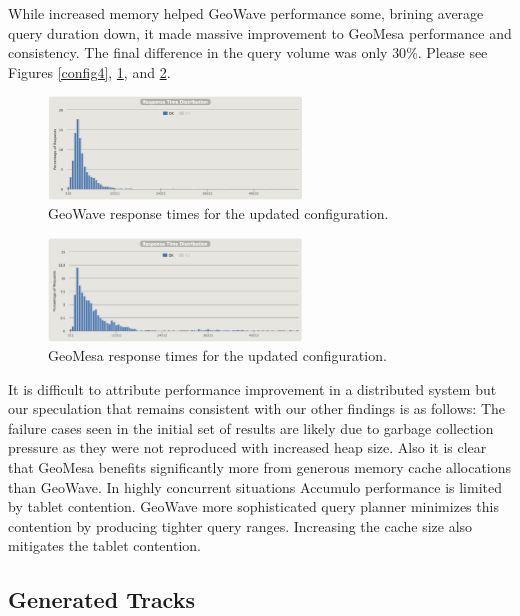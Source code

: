 While increased memory helped GeoWave performance some, brining average query duration down, it made massive improvement to GeoMesa performance and consistency.
The final difference in the query volume was only $30$\%.
Please see Figures \ref{config4}, \ref{config4distrogw}, and \ref{config4distrogm}.

\begin{figure}[h!tb]
  \centering
  \includegraphics[width=0.60\textwidth]{images/mt4-gw.png}
  \caption{GeoWave response times for the updated configuration.}
  \label{config4distrogw}
\end{figure}

\begin{figure}[h!tb]
  \centering
  \includegraphics[width=0.60\textwidth]{images/gm-4.png}
  \caption{GeoMesa response times for the updated configuration.}
  \label{config4distrogm}
\end{figure}

It is difficult to attribute performance improvement in a distributed system but our speculation that remains consistent with our other findings is as follows: The failure cases seen in the initial set of results are likely due to garbage collection pressure as they were not reproduced with increased heap size.
Also it is clear that GeoMesa benefits significantly more from generous memory cache allocations than GeoWave.
In highly concurrent situations Accumulo performance is limited by tablet contention.
GeoWave more sophisticated query planner minimizes this contention by producing tighter query ranges.
Increasing the cache size also mitigates the tablet contention.

\subsection{Generated Tracks}


